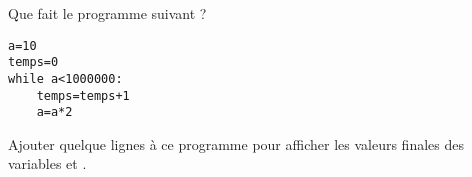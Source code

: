 
\begin{exercice}\label{exoPremiere-0058}

    Que fait le programme suivant ?
    \begin{verbatim}
a=10
temps=0
while a<1000000:
    temps=temps+1
    a=a*2
    \end{verbatim}

    Ajouter quelque lignes à ce programme pour afficher les valeurs finales des variables  et .


\end{exercice}

